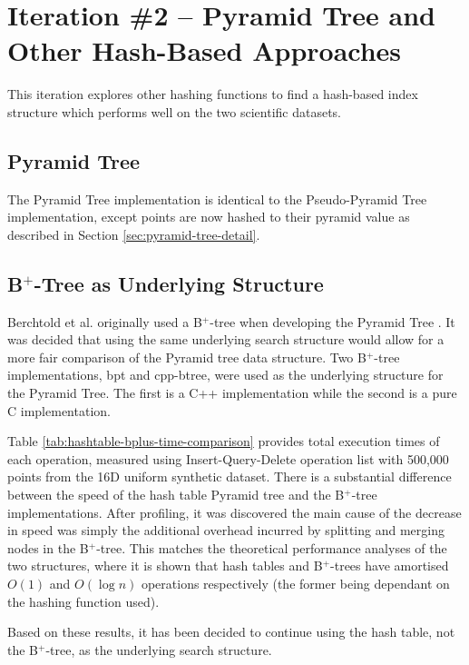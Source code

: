 \section{Iteration \#2 -- Pyramid Tree and Other Hash-Based Approaches}

This iteration explores other hashing functions to find a hash-based index structure which performs well on the two scientific datasets.

\subsection{Pyramid Tree}

The Pyramid Tree implementation is identical to the Pseudo-Pyramid Tree implementation, except points are now hashed to their pyramid value as described in Section \ref{sec:pyramid-tree-detail}.

\subsection{B${}^+$-Tree as Underlying Structure}

Berchtold et al. originally used a B${}^{+}$-tree when developing the Pyramid Tree \cite{pyramid-tree}. It was decided that using the same underlying search structure would allow for a more fair comparison of the Pyramid tree data structure. Two B${}^{+}$-tree implementations, bpt\cite{bpt} and cpp-btree\cite{cpp-btree}, were used as the underlying structure for the Pyramid Tree. The first is a C++ implementation while the second is a pure C implementation.

Table \ref{tab:hashtable-bplus-time-comparison} provides total execution times of each operation, measured using Insert-Query-Delete operation list with 500,000 points from the 16D uniform synthetic dataset. There is a substantial difference between the speed of the hash table Pyramid tree and the B${}^{+}$-tree implementations. After profiling, it was discovered the main cause of the decrease in speed was simply the additional overhead incurred by splitting and merging nodes in the B${}^{+}$-tree. This matches the theoretical performance analyses of the two structures, where it is shown that hash tables and B${}^{+}$-trees have amortised $O(1)$ and $O(\log n)$ operations respectively (the former being dependant on the hashing function used).

Based on these results, it has been decided to continue using the hash table, not the B${}^{+}$-tree, as the underlying search structure.

